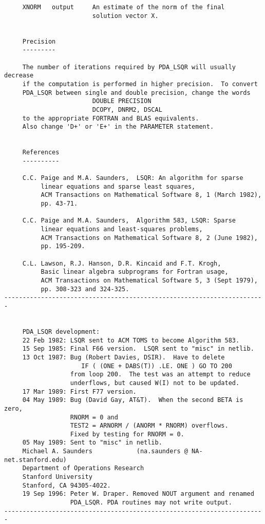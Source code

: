 \begin{verbatim}
     XNORM   output     An estimate of the norm of the final
                        solution vector X.


     Precision
     ---------

     The number of iterations required by PDA_LSQR will usually decrease
     if the computation is performed in higher precision.  To convert
     PDA_LSQR between single and double precision, change the words
                        DOUBLE PRECISION
                        DCOPY, DNRM2, DSCAL
     to the appropriate FORTRAN and BLAS equivalents.
     Also change 'D+' or 'E+' in the PARAMETER statement.


     References
     ----------

     C.C. Paige and M.A. Saunders,  LSQR: An algorithm for sparse
          linear equations and sparse least squares,
          ACM Transactions on Mathematical Software 8, 1 (March 1982),
          pp. 43-71.

     C.C. Paige and M.A. Saunders,  Algorithm 583, LSQR: Sparse
          linear equations and least-squares problems,
          ACM Transactions on Mathematical Software 8, 2 (June 1982),
          pp. 195-209.

     C.L. Lawson, R.J. Hanson, D.R. Kincaid and F.T. Krogh,
          Basic linear algebra subprograms for Fortran usage,
          ACM Transactions on Mathematical Software 5, 3 (Sept 1979),
          pp. 308-323 and 324-325.
-----------------------------------------------------------------------


     PDA_LSQR development:
     22 Feb 1982: LSQR sent to ACM TOMS to become Algorithm 583.
     15 Sep 1985: Final F66 version.  LSQR sent to "misc" in netlib.
     13 Oct 1987: Bug (Robert Davies, DSIR).  Have to delete
                     IF ( (ONE + DABS(T)) .LE. ONE ) GO TO 200
                  from loop 200.  The test was an attempt to reduce
                  underflows, but caused W(I) not to be updated.
     17 Mar 1989: First F77 version.
     04 May 1989: Bug (David Gay, AT&T).  When the second BETA is zero,
                  RNORM = 0 and
                  TEST2 = ARNORM / (ANORM * RNORM) overflows.
                  Fixed by testing for RNORM = 0.
     05 May 1989: Sent to "misc" in netlib.
     Michael A. Saunders            (na.saunders @ NA-net.stanford.edu)
     Department of Operations Research
     Stanford University
     Stanford, CA 94305-4022.
     19 Sep 1996: Peter W. Draper. Removed NOUT argument and renamed
                  PDA_LSQR. PDA routines may not write output.
-----------------------------------------------------------------------
\end{verbatim}


